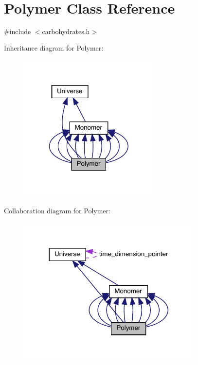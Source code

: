 \hypertarget{class_polymer}{}\section{Polymer Class Reference}
\label{class_polymer}


{\ttfamily \#include $<$carbohydrates.\+h$>$}



Inheritance diagram for Polymer\+:\nopagebreak
\begin{figure}[H]
\begin{center}
\leavevmode
\includegraphics[width=202pt]{class_polymer__inherit__graph}
\end{center}
\end{figure}


Collaboration diagram for Polymer\+:\nopagebreak
\begin{figure}[H]
\begin{center}
\leavevmode
\includegraphics[width=263pt]{class_polymer__coll__graph}
\end{center}
\end{figure}
